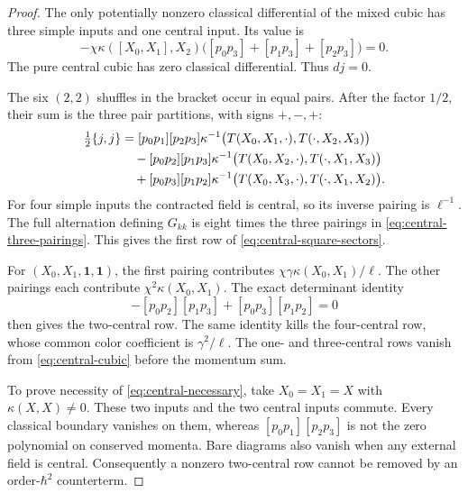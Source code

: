 \begin{proof}
The only potentially nonzero classical differential of the mixed cubic
has three simple inputs and one central input.  Its value is
\begin{equation}
 -\chi\kappa([X_0,X_1],X_2)
 \bigl([p_0p_3]+[p_1p_3]+[p_2p_3]\bigr)=0.
\end{equation}
The pure central cubic has zero classical differential.  Thus $dj=0$.

The six $(2,2)$ shuffles in the bracket occur in equal pairs.  After the
factor $1/2$, their sum is the three pair partitions, with signs
$+,-,+$:
\begin{align}
 \tfrac12\{j,j\}
 &= [p_0p_1][p_2p_3]
       \kappa^{-1}\bigl(T(X_0,X_1,\cdot),T(\cdot,X_2,X_3)\bigr)\notag\\
 &\quad-[p_0p_2][p_1p_3]
       \kappa^{-1}\bigl(T(X_0,X_2,\cdot),T(\cdot,X_1,X_3)\bigr)\notag\\
 &\quad+[p_0p_3][p_1p_2]
       \kappa^{-1}\bigl(T(X_0,X_3,\cdot),T(\cdot,X_1,X_2)\bigr).
 \label{eq:central-three-pairings}
\end{align}
For four simple inputs the contracted field is central, so its inverse
pairing is $\ell^{-1}$.  The full alternation defining $G_{kk}$ is eight
times the three pairings in \eqref{eq:central-three-pairings}.  This gives
the first row of \eqref{eq:central-square-sectors}.

For $(X_0,X_1,\mathbf1,\mathbf1)$, the first pairing contributes
$\chi\gamma\kappa(X_0,X_1)/\ell$.  The other pairings each contribute
$\chi^2\kappa(X_0,X_1)$.  The exact determinant identity
\begin{equation}
 [p_0p_1][p_2p_3]-[p_0p_2][p_1p_3]
       +[p_0p_3][p_1p_2]=0
 \label{eq:central-plucker}
\end{equation}
then gives the two-central row.  The same identity kills the
four-central row, whose common color coefficient is $\gamma^2/\ell$.
The one- and three-central rows vanish from
\eqref{eq:central-cubic} before the momentum sum.

To prove necessity of \eqref{eq:central-necessary}, take
$X_0=X_1=X$ with $\kappa(X,X)\ne0$.  These two inputs and the two
central inputs commute.  Every classical boundary vanishes on them,
whereas $[p_0p_1][p_2p_3]$ is not the zero polynomial on conserved
momenta.  Bare diagrams also vanish when any external field is central.
Consequently a nonzero two-central row cannot be removed by an
order-$\hbar^2$ counterterm.
\end{proof}

